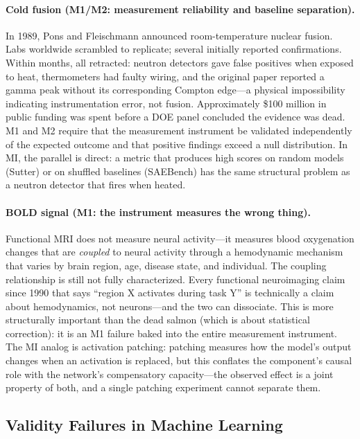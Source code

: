 \documentclass{article}
\begin{document}
\paragraph{Cold fusion (M1/M2: measurement reliability and baseline separation).}
In 1989, Pons and Fleischmann announced room-temperature nuclear fusion. Labs worldwide scrambled to replicate; several initially reported confirmations. Within months, all retracted: neutron detectors gave false positives when exposed to heat, thermometers had faulty wiring, and the original paper reported a gamma peak without its corresponding Compton edge---a physical impossibility indicating instrumentation error, not fusion. Approximately \$100 million in public funding was spent before a DOE panel concluded the evidence was dead. M1 and M2 require that the measurement instrument be validated independently of the expected outcome and that positive findings exceed a null distribution. In MI, the parallel is direct: a metric that produces high scores on random models (Sutter) or on shuffled baselines (SAEBench) has the same structural problem as a neutron detector that fires when heated.

\paragraph{BOLD signal (M1: the instrument measures the wrong thing).}
Functional MRI does not measure neural activity---it measures blood oxygenation changes that are \emph{coupled} to neural activity through a hemodynamic mechanism that varies by brain region, age, disease state, and individual. The coupling relationship is still not fully characterized. Every functional neuroimaging claim since 1990 that says ``region X activates during task Y'' is technically a claim about hemodynamics, not neurons---and the two can dissociate. This is more structurally important than the dead salmon (which is about statistical correction): it is an M1 failure baked into the entire measurement instrument. The MI analog is activation patching: patching measures how the model's output changes when an activation is replaced, but this conflates the component's causal role with the network's compensatory capacity---the observed effect is a joint property of both, and a single patching experiment cannot separate them.

\subsection{Validity Failures in Machine Learning}
\end{document}
